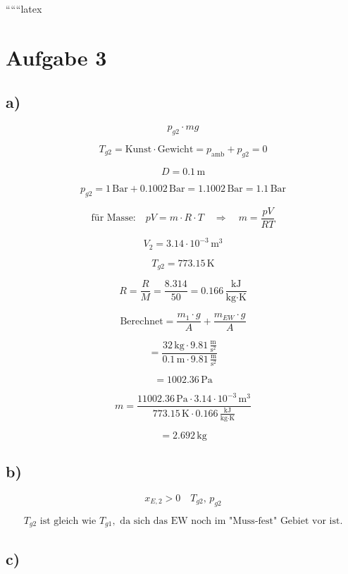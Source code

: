 
``````latex


\section*{Aufgabe 3}

\subsection*{a)}

\[
p_{g2} \cdot mg
\]

\[
T_{g2} = \text{Kunst} \cdot \text{Gewicht} = p_{\text{amb}} + p_{g2} = 0
\]

\[
D = 0.1 \, \text{m}
\]

\[
p_{g2} = 1 \, \text{Bar} + 0.1002 \, \text{Bar} = 1.1002 \, \text{Bar} = 1.1 \, \text{Bar}
\]

\[
\text{für Masse:} \quad pV = m \cdot R \cdot T \quad \Rightarrow \quad m = \frac{pV}{RT}
\]

\[
V_2 = 3.14 \cdot 10^{-3} \, \text{m}^3
\]

\[
T_{g2} = 773.15 \, \text{K}
\]

\[
R = \frac{R}{M} = \frac{8.314}{50} = 0.166 \, \frac{\text{kJ}}{\text{kg} \cdot \text{K}}
\]

\[
\text{Berechnet} = \frac{m_1 \cdot g}{A} + \frac{m_{EW} \cdot g}{A}
\]

\[
= \frac{32 \, \text{kg} \cdot 9.81 \, \frac{\text{m}}{\text{s}^2}}{0.1 \, \text{m} \cdot 9.81 \, \frac{\text{m}}{\text{s}^2}}
\]

\[
= 1002.36 \, \text{Pa}
\]

\[
m = \frac{11002.36 \, \text{Pa} \cdot 3.14 \cdot 10^{-3} \, \text{m}^3}{773.15 \, \text{K} \cdot 0.166 \, \frac{\text{kJ}}{\text{kg} \cdot \text{K}}}
\]

\[
= 2.692 \, \text{kg}
\]

\subsection*{b)}

\[
x_{E,2} > 0 \quad T_{g2}, \, p_{g2}
\]

\[
T_{g2} \text{ ist gleich wie } T_{g1}, \text{ da sich das EW noch im "Muss-fest" Gebiet vor ist.}
\]

\subsection*{c)}

